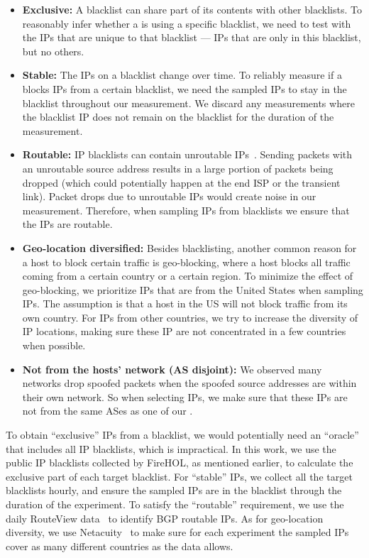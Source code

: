 \begin{itemize}
    \item \textbf{Exclusive:}
    A blacklist can share part of its contents with other blacklists. To
    reasonably infer whether a {} is using a specific blacklist, we
    need to test with the IPs that are unique to that blacklist --- IPs that are
    only in this blacklist, but no others.

    \item \textbf{Stable:}
    The IPs on a blacklist change over time. To reliably measure if a
    {} blocks IPs from a certain blacklist, we need the
    sampled IPs to stay in the blacklist throughout our measurement. We discard
    any measurements where the blacklist IP does not remain on the blacklist for
    the duration of the measurement.

    \item \textbf{Routable:}
    IP blacklists can contain unroutable IPs~\cite{li2019reading}. Sending
    packets with an unroutable source address results in a large portion of
    packets being dropped (which could potentially happen at the end ISP or the
    transient link). Packet drops due to unroutable IPs would create noise in our measurement.
    Therefore, when sampling IPs from blacklists we ensure that the
    IPs are routable.

    \item \textbf{Geo-location diversified:}
    Besides blacklisting, another common reason for a host to block certain
    traffic is geo-blocking, where a host blocks all traffic coming from a certain
    country or a certain region. To minimize the effect of geo-blocking, we
    prioritize IPs that are from the United States when sampling IPs. The assumption is that a
    host in the US will not block traffic from its own country. For IPs from other
    countries, we try to increase the diversity of IP locations, making sure
    these IP are not concentrated in a few countries when possible.

    \item \textbf{Not from the hosts' network (AS disjoint):}
    We observed many networks drop spoofed packets when the spoofed source addresses are
    within their own network. So when selecting IPs, we make sure that these IPs
    are not from the same ASes as one of our {}.

\end{itemize}

To obtain ``exclusive'' IPs from a blacklist, we would potentially need an
``oracle'' that includes all IP blacklists, which is impractical. In this work,
we use the public IP blacklists collected by FireHOL, as mentioned earlier, to calculate the
exclusive part of each target blacklist. For ``stable'' IPs, we
collect all the target blacklists hourly, and ensure the sampled IPs are in
the blacklist through the duration of the experiment. To satisfy the
``routable'' requirement, we use the daily RouteView data~\cite{Routeview}
to identify BGP routable IPs. As for geo-location diversity, we use
Netacuity~\cite{netacuity} to make sure for each experiment the sampled IPs
cover as many different countries as the data allows.
